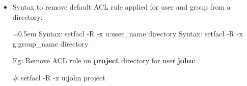 \begin{flushleft}
\begin{itemize}
\begin{itemize}
\bigskip
\bigskip

	\item Syntax to remove default ACL rule applied for user and group from a directory:
	\bigskip
	\begin{tcolorbox}[breakable,notitle,boxrule=-0pt,colback=pink,colframe=pink]
		\color{black}
		\font=0.5em
		Syntax: setfacl -R -x u:user\_name directory
		\newline
		Syntax: setfacl -R -x g:group\_name directory
		\font=4pt
	\end{tcolorbox}
	Eg: Remove ACL rule on \textbf{project} directory for user \textbf{john}:
	\bigskip
	\begin{tcolorbox}[breakable,notitle,boxrule=-0pt,colback=black,colframe=black]
		\color{green}
		\font=9pt
		\# setfacl -R -x u:john project
		\font=4pt
	\end{tcolorbox}
		
\end{itemize}

\end{itemize}

\end{flushleft}

\newpage

